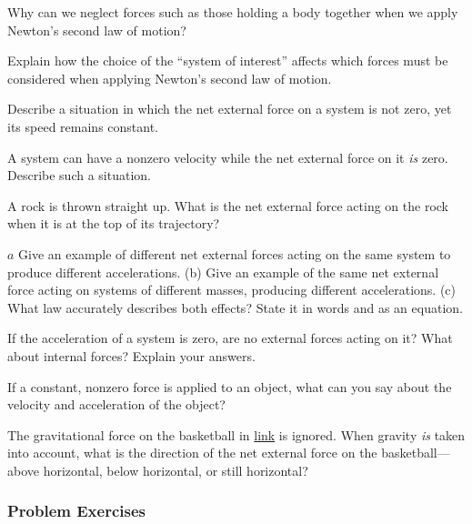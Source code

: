 \documentclass[
]{book}
\begin{document}
\hypertarget{fs-id2423185}{}
\leavevmode{}%
Why can we neglect forces such as those holding a body together when we
apply Newton's second law of motion?

\hypertarget{fs-id3010660}{}
\leavevmode{}%
Explain how the choice of the ``system of interest'' affects which forces
must be considered when applying Newton's second law of motion.

\hypertarget{fs-id2672485}{}
\leavevmode{}%
Describe a situation in which the net external force on a system is not
zero, yet its speed remains constant.

\hypertarget{fs-id3026744}{}
\leavevmode{}%
A system can have a nonzero velocity while the net external force on it
\emph{is} zero. Describe such a situation.

\hypertarget{fs-id1449832}{}
\leavevmode{}%
A rock is thrown straight up. What is the net external force acting on
the rock when it is at the top of its trajectory?

\hypertarget{fs-id1475076}{}
\leavevmode{}%
\(a\) Give an example of different net external forces acting on the
same system to produce different accelerations. (b) Give an example of
the same net external force acting on systems of different masses,
producing different accelerations. (c) What law accurately describes
both effects? State it in words and as an equation.

\hypertarget{fs-id1930138}{}
\leavevmode{}%
If the acceleration of a system is zero, are no external forces acting
on it? What about internal forces? Explain your answers.

\hypertarget{fs-id3180550}{}
\leavevmode{}%
If a constant, nonzero force is applied to an object, what can you say
about the velocity and acceleration of the object?

\hypertarget{fs-id3210019}{}
\leavevmode{}%
The gravitational force on the basketball in
\protect\hyperlink{import-auto-id1375143}{link} is ignored. When
gravity \emph{is} taken into account, what is the direction of the net
external force on the basketball---above horizontal, below horizontal,
or still horizontal?

\hypertarget{fs-id1910070}{}
\hypertarget{problem-exercises}{%
\subsubsection{Problem Exercises}\label{problem-exercises}}
\end{document}
